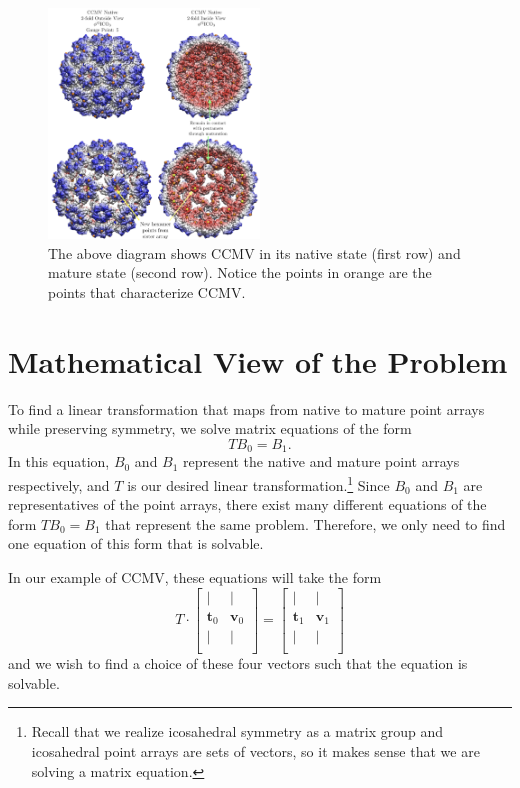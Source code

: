 \documentclass[a4paper,10pt]{article}
\theoremstyle{plain}
\theoremstyle{definition}
\theoremstyle{remark}
\renewcommand{\vec}[1]{\textbf{#1}}
\begin{document}
\begin{figure}[!h]
	\centering
	\captionsetup{width=0.5\textwidth}
	\includegraphics[width=0.5\textwidth]{images/CCMV_maturation.png}
	\caption{The above diagram shows CCMV in its native state (first row) and mature state (second row). Notice the points in orange are the points that characterize CCMV.}
	\label{fig:CCMV_maturation}
\end{figure}

\section{Mathematical View of the Problem}
To find a linear transformation that maps from native to mature point arrays while preserving symmetry, we solve matrix equations of the form \[TB_0 = B_1.\]
In this equation, \(B_0\) and \(B_1\) represent the native and mature point arrays respectively, and \(T\) is our desired linear transformation.\footnote{Recall that we realize icosahedral symmetry as a matrix group and icosahedral point arrays are sets of vectors, so it makes sense that we are solving a matrix equation.}
Since \(B_0\) and \(B_1\) are representatives of the point arrays, there exist many different equations of the form \(TB_0 = B_1\) that represent the same problem.
Therefore, we only need to find one equation of this form that is solvable.

\noindent In our example of CCMV, these equations will take the form 
\[T\cdot \begin{bmatrix}
    | & | \\
    \vec{t}_0 & \vec{v}_0 \\
    | & | \\
\end{bmatrix} = \begin{bmatrix}
    | & | \\
    \vec{t}_1 & \vec{v}_1 \\
    | & | \\
\end{bmatrix}\]
and we wish to find a choice of these four vectors such that the equation is solvable.
\end{document}
